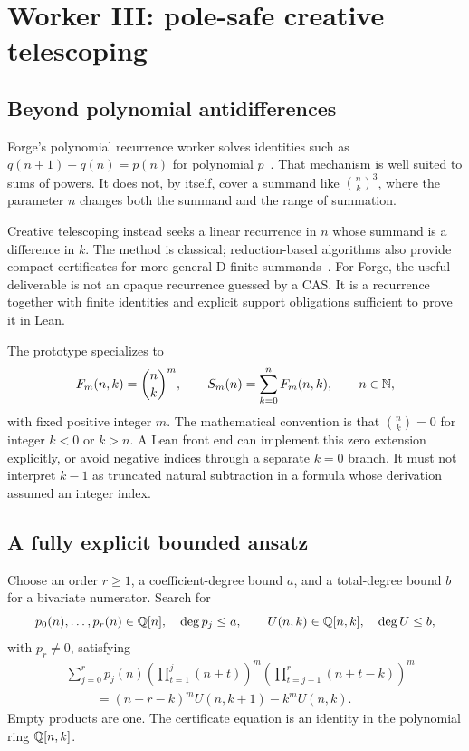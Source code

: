 \section{Worker III: pole-safe creative telescoping}
\label{sec:telescoping}

\subsection{Beyond polynomial antidifferences}

Forge's polynomial recurrence worker solves identities such as
$q(n+1)-q(n)=p(n)$ for polynomial $p$~\cite{forge-structural}. That mechanism is
well suited to sums of powers. It does not, by itself, cover a summand like
$\binom nk^3$, where the parameter $n$ changes both the summand and the range of
summation.

Creative telescoping instead seeks a linear recurrence in $n$ whose summand is
a difference in $k$. The method is classical; reduction-based algorithms also
provide compact certificates for more general D-finite summands~\cite{brochet}.
For Forge, the useful deliverable is not an opaque recurrence guessed by a CAS.
It is a recurrence together with finite identities and explicit support
obligations sufficient to prove it in Lean.

The prototype specializes to
\[
 F_m(n,k)=\binom nk^m,\qquad
 S_m(n)=\sum_{k=0}^{n}F_m(n,k),\qquad n\in\mathbb{N},
\]
with fixed positive integer $m$. The mathematical convention is that
$\binom nk=0$ for integer $k<0$ or $k>n$. A Lean front end can implement this
zero extension explicitly, or avoid negative indices through a separate
$k=0$ branch. It must not interpret $k-1$ as truncated natural subtraction in a
formula whose derivation assumed an integer index.

\subsection{A fully explicit bounded ansatz}

Choose an order $r\ge1$, a coefficient-degree bound $a$, and a total-degree
bound $b$ for a bivariate numerator. Search for
\[
 p_0(n),\ldots,p_r(n)\in\mathbb{Q}[n],\quad \deg p_j\le a,
 \qquad U(n,k)\in\mathbb{Q}[n,k],\quad\deg U\le b,
\]
with $p_r\ne0$, satisfying
\begin{equation}
\begin{split}
 &\sum_{j=0}^{r}p_j(n)
   \left(\prod_{t=1}^{j}(n+t)\right)^m
   \left(\prod_{t=j+1}^{r}(n+t-k)\right)^m\\
 &\hspace{1cm}=(n+r-k)^mU(n,k+1)-k^mU(n,k).
\end{split}
\label{eq:cleared-telescope}
\end{equation}
Empty products are one. The certificate equation is an identity in the
polynomial ring $\mathbb{Q}[n,k]$.

